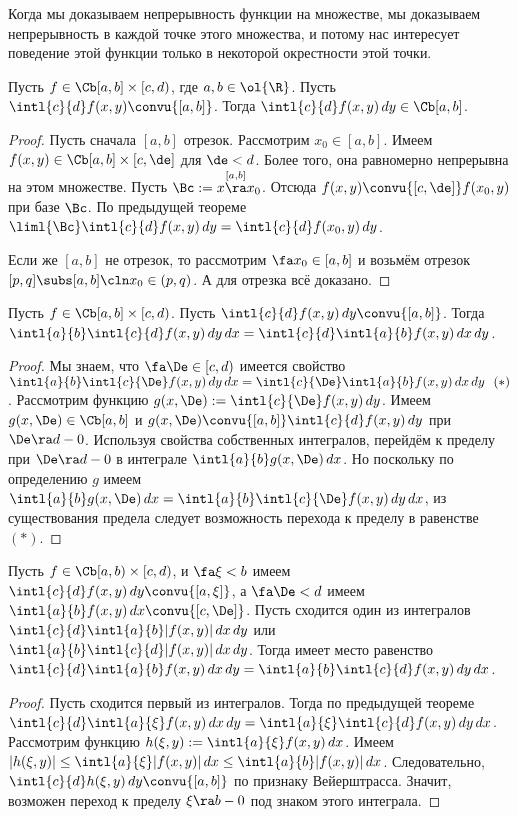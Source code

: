 \documentclass[a4paper]{article}
\newcommand{\intlab}{\intl{a}{b}}
\begin{document}
\begin{note}
Когда мы доказываем непрерывность функции на множестве, мы доказываем непрерывность в
каждой точке этого множества, и потому нас
интересует поведение этой функции только в некоторой окрестности этой точки.
\end{note}

\begin{imp}
Пусть $f \in\Cb[a,b]\times[c,d)$, где $a,b \in \ol{\R}$. Пусть $\intl{c}{d}f(x,y)\convu{[a,b]}$.
Тогда $\intl{c}{d}f(x,y)\,d y \in\Cb[a,b]$.
\end{imp}
\begin{proof}
Пусть сначала $[a,b]$ отрезок. Рассмотрим $x_0 \in [a,b]$. Имеем
$f(x,y)\in\Cb[a,b]\times[c,\de]$ для $\de < d$. Более того, она равномерно непрерывна на этом
множестве. Пусть $\Bc := x \overset{[a,b]}{\ra} x_0$. Отсюда $f(x,y)\convu{[c,\de]}f(x_0,y)$ при
базе $\Bc$. По предыдущей теореме $\liml{\Bc}\intl{c}{d}f(x,y)\,d y=\intl{c}{d}f(x_0,y)\,d y$.

Если же $[a,b]$ не отрезок, то рассмотрим $\fa x_0 \in [a,b]$ и возьмём отрезок
$[p,q] \subs [a,b]\cln x_0 \in (p,q)$. А для отрезка всё доказано.
\end{proof}

\begin{theorem}
Пусть $f\in\Cb[a,b]\times[c,d)$. Пусть $\intl{c}{d}f(x,y)\,d y\convu{[a,b]}$. Тогда $\intlab
\intl{c}{d}f(x,y)\,d y\,d x = \intl{c}{d}\intlab f(x,y)\,d x\,d y$.
\end{theorem}
\begin{proof}
Мы знаем, что $\fa \De \in [c,d)$ имеется свойство $\intlab \intl{c}{\De}f(x,y)\,d y\,d x =
\intl{c}{\De}\intlab f(x,y)\,d x\,d y~~(*)$. Рассмотрим функцию $g(x,\De) :=
\intl{c}{\De}f(x,y)\,d y$. Имеем $g(x,\De) \in\Cb[a,b]$ и
$g(x,\De)\convu{[a,b]}\intl{c}{d}f(x,y)\,d y$ при $\De \ra d-0$. Используя свойства собственных
интегралов, перейдём к пределу при $\De \ra d-0$ в интеграле $\intlab g(x,\De)\,d x$. Но поскольку
по определению $g$ имеем $\intlab g(x,\De)\,d x=\intlab \intl{c}{\De}f(x,y)\,d y\,d x$, из
существования предела следует возможность перехода к пределу в равенстве $(*)$.
\end{proof}

\begin{theorem}
Пусть $f\in\Cb[a,b)\times[c,d)$, и $\fa \xi < b$ имеем $\intl{c}{d}f(x,y)\,d y
\convu{[a,\xi]}$, а $\fa \De < d$ имеем $\intlab f(x,y)\,d x \convu{[c,\De]}$. Пусть сходится
один из интегралов $\intl{c}{d}\intlab |f(x,y)|\,d x\,d y$ или $\intlab \intl{c}{d}|f(x,y)|\,d
x\,d y$. Тогда имеет место равенство $\intl{c}{d}\intlab f(x,y)\,d x\,d y=\intlab \intl{c}{d}f(x,y)\,d y\,d x$.
\end{theorem}
\begin{proof}
Пусть сходится первый из интегралов. Тогда по предыдущей теореме
$\intl{c}{d}\intl{a}{\xi}f(x,y)\,d x\,d y=\intl{a}{\xi}\intl{c}{d}f(x,y)\,d y\,d x$. Рассмотрим
функцию $h(\xi,y) := \intl{a}{\xi}f(x,y)\,d x$. Имеем $|h(\xi,y)| \le \intl{a}{\xi}|f(x,y)|\,d x
\le \intlab |f(x,y)|\,d x$. Следовательно, $\intl{c}{d}h(\xi,y)\,d y \convu{[a,b]}$ по признаку
Вейерштрасса. Значит, возможен переход к пределу $\xi \ra b-0$ под знаком этого интеграла.
\end{proof}
\end{document}

